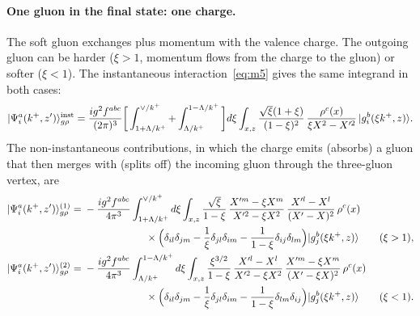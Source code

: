 \paragraph*{One gluon in the final state: one charge.} The soft gluon exchanges plus momentum with the valence charge. The outgoing gluon can be harder ($\xi>1$, momentum flows from the charge to the gluon) or softer ($\xi<1$). The instantaneous interaction~\eqref{eq:m5} gives the same integrand in both cases:
\begin{equation}
|\Psi^a_i(k^+,z')\rangle^{\rm inst}_{g\rho}=\frac{ig^2f^{abc}}{(2\pi)^3}\bigg[\int_{1+\Lambda/k^+}^{\vee/k^+}+\int_{\Lambda/k^+}^{1-\Lambda/k^+}\bigg]d\xi\int_{x,z}\frac{\sqrt\xi(1+\xi)}{(1-\xi)^2}\,\frac{\rho^c(x)}{\xi X^2-X'^2}\,|g^b_i(\xi k^+,z)\rangle .
\label{eq:inst}
\end{equation}
The non-instantaneous contributions, in which the charge emits (absorbs) a gluon that then merges with (splits off) the incoming gluon through the three-gluon vertex, are
\begin{align}
|\Psi^a_i(k^+,z')\rangle^{(1)}_{g\rho}={}&-\frac{ig^2f^{abc}}{4\pi^3}\int_{1+\Lambda/k^+}^{\vee/k^+}d\xi\int_{x,z}\frac{\sqrt\xi}{1-\xi}\,\frac{X'^m-\xi X^m}{X'^2-\xi X^2}\,\frac{X'^l-X^l}{(X'-X)^2}\,\rho^c(x)\notag\\
&\hspace{6em}\times\Big(\delta_{il}\delta_{jm}-\frac1\xi\delta_{jl}\delta_{im}-\frac{1}{1-\xi}\delta_{ij}\delta_{lm}\Big)|g^b_j(\xi k^+,z)\rangle\qquad(\xi>1),\label{eq:nonInst1}\\
|\Psi^a_i(k^+,z')\rangle^{(2)}_{g\rho}={}&-\frac{ig^2f^{abc}}{4\pi^3}\int_{\Lambda/k^+}^{1-\Lambda/k^+}d\xi\int_{x,z}\frac{\xi^{3/2}}{1-\xi}\,\frac{X'^l-X^l}{X'^2-\xi X^2}\,\frac{X'^m-\xi X^m}{(X'-\xi X)^2}\,\rho^c(x)\notag\\
&\hspace{6em}\times\Big(\delta_{il}\delta_{jm}-\frac1\xi\delta_{jl}\delta_{im}-\frac{1}{1-\xi}\delta_{lm}\delta_{ij}\Big)|g^b_j(\xi k^+,z)\rangle\qquad(\xi<1).\label{eq:nonInst2}
\end{align}

